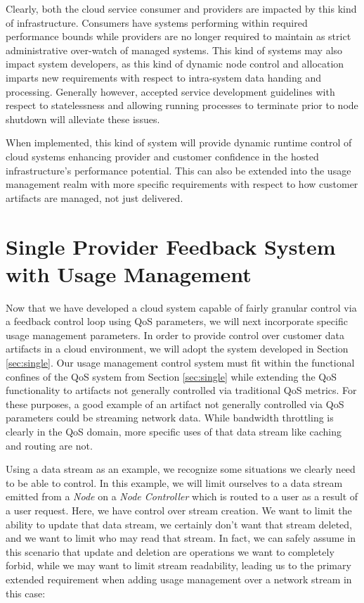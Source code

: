 \documentclass[times, 10pt,twocolumn]{article}
\begin{document}
Clearly, both the cloud service consumer and providers are impacted by this kind of infrastructure.  Consumers have systems performing within required performance bounds while providers are no longer required to maintain as strict administrative over-watch of managed systems.  This kind of systems may also impact system developers, as this kind of dynamic node control and allocation imparts new requirements with respect to intra-system data handing and processing.  Generally however, accepted service development guidelines with respect to statelessness and allowing running processes to terminate prior to node shutdown will alleviate these issues.

When implemented, this kind of system will provide dynamic runtime control of cloud systems enhancing provider and customer confidence in the hosted infrastructure's performance potential.  This can also be extended into the usage management realm with more specific requirements with respect to how customer artifacts are managed, not just delivered.

\section{Single Provider Feedback System with Usage Management}\label{sec:singleUm}
Now that we have developed a cloud system capable of fairly granular control via a feedback control loop using QoS parameters, we will next incorporate specific usage management parameters.  In order to provide control over customer data artifacts in a cloud environment, we will adopt the system developed in Section \ref{sec:single}.  Our usage management control system must fit within the functional confines of the QoS system from Section \ref{sec:single} while extending the QoS functionality to artifacts not generally controlled via traditional QoS metrics.  For these purposes, a good example of an artifact not generally controlled via QoS parameters could be streaming network data.  While bandwidth throttling is clearly in the QoS domain, more specific uses of that data stream like caching and routing are not.   

Using a data stream as an example, we recognize some situations we clearly need to be able to control.  In this example, we will limit ourselves to a data stream emitted from a \textit{Node} on a \textit{Node Controller} which is routed to a user as a result of a user request.  Here, we have control over stream creation.  We want to limit the ability to update that data stream, we certainly don't want that stream deleted, and we want to limit who may read that stream.  In fact, we can safely assume in this scenario that update and deletion are operations we want to completely forbid, while we may want to limit stream readability, leading us to the primary extended requirement when adding usage management over a network stream in this case:
\end{document}

